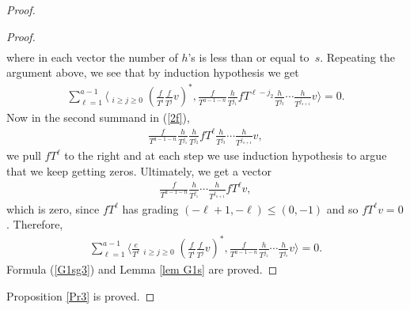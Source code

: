 \documentclass[pdftex]{sigma}
\numberwithin{equation}{section}
\begin{document}
\begin{proof}
\begin{proof}
\begin{gather*}
\end{gather*}
where in each vector the number of $h$'s is less than or equal to~$s$. Repeating the argument above, we see that by induction hypothesis we get
\begin{gather*}
\sum_{\ell=1}^{a-1} \bigg\langle \mathop{\sum_{i+j=a-1-\ell}}_{i\geq j\geq 0} \left(\frac{f}{T^i}\frac{f}{T^j}v\right)^*, \frac{f}{T^{a-1-n}} \frac{h}{T^{j_1}} fT^{\ell-j_2} \frac{h}{T^{j_3}} \cdots \frac{h}{T^{j_{s+1}}} v \bigg\rangle = 0.
\end{gather*}
Now in the second summand in (\ref{2f}),
\begin{gather*}
\frac{f}{T^{a-1-n}} \frac{h}{T^{j_1}} \frac{h}{T^{j_2}} fT^{\ell} \frac{h}{T^{j_3}} \cdots \frac{h}{T^{j_{s+1}}} v,
\end{gather*}
we pull $fT^{\ell}$ to the right and at each step we use induction hypothesis to argue that we keep getting zeros. Ultimately, we get a vector
\begin{gather*}
\frac{f}{T^{a-1-n}} \frac{h}{T^{j_1}} \cdots \frac{h}{T^{j_{s+1}}} fT^{\ell} v,
\end{gather*}
which is zero, since $fT^{\ell}$ has grading $(-\ell+1, -\ell) \leq (0,-1)$ and so $fT^{\ell}v=0$. Therefore,
\begin{gather*}
\sum_{\ell=1}^{a-1} \bigg\langle \frac{e}{T^{\ell}} \mathop{\sum_{i+j=a-1-\ell}}_{i\geq j\geq 0} \left(\frac{f}{T^i}\frac{f}{T^j}v\right)^*, \frac{f}{T^{a-1-n}} \frac{h}{T^{j_1}} \cdots \frac{h}{T^{j_{s}}} v \bigg\rangle = 0.
\end{gather*}
Formula (\ref{G1sg3}) and Lemma \ref{lem G1s} are proved.
\end{proof}
Proposition \ref{Pr3} is proved.
\end{proof}
\end{document}
